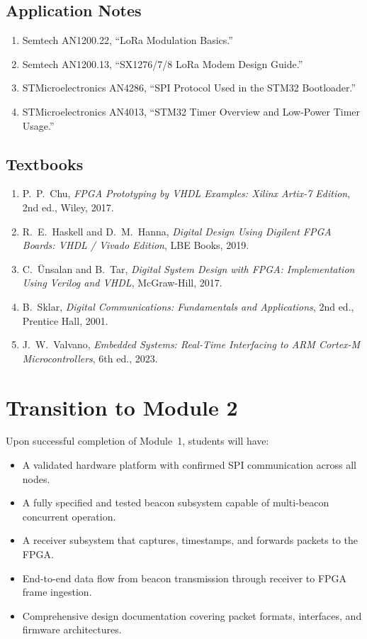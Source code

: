 \documentclass[11pt,letterpaper]{article}
\begin{document}
	\subsection{Application Notes}
	
	\begin{enumerate}[leftmargin=2em]
		\item Semtech AN1200.22, ``LoRa Modulation Basics.''
		\item Semtech AN1200.13, ``SX1276/7/8 LoRa Modem Design Guide.''
		\item STMicroelectronics AN4286, ``SPI Protocol Used in the STM32 Bootloader.''
		\item STMicroelectronics AN4013, ``STM32 Timer Overview and Low-Power Timer Usage.''
	\end{enumerate}
	
	\subsection{Textbooks}
	
	\begin{enumerate}[leftmargin=2em]
		\item P.\ P.\ Chu, \textit{FPGA Prototyping by VHDL Examples: Xilinx Artix-7 Edition}, 2nd ed., Wiley, 2017.
		\item R.\ E.\ Haskell and D.\ M.\ Hanna, \textit{Digital Design Using Digilent FPGA Boards: VHDL / Vivado Edition}, LBE Books, 2019.
		\item C.\ \"Unsalan and B.\ Tar, \textit{Digital System Design with FPGA: Implementation Using Verilog and VHDL}, McGraw-Hill, 2017.
		\item B.\ Sklar, \textit{Digital Communications: Fundamentals and Applications}, 2nd ed., Prentice Hall, 2001.
		\item J.\ W.\ Valvano, \textit{Embedded Systems: Real-Time Interfacing to ARM Cortex-M Microcontrollers}, 6th ed., 2023.
	\end{enumerate}
	
	\section{Transition to Module 2}
	
	Upon successful completion of Module~1, students will have:
	\begin{itemize}[leftmargin=2em]
		\item A validated hardware platform with confirmed SPI communication across all nodes.
		\item A fully specified and tested beacon subsystem capable of multi-beacon concurrent operation.
		\item A receiver subsystem that captures, timestamps, and forwards packets to the FPGA.
		\item End-to-end data flow from beacon transmission through receiver to FPGA frame ingestion.
		\item Comprehensive design documentation covering packet formats, interfaces, and firmware architectures.
	\end{itemize}
	
\end{document}
